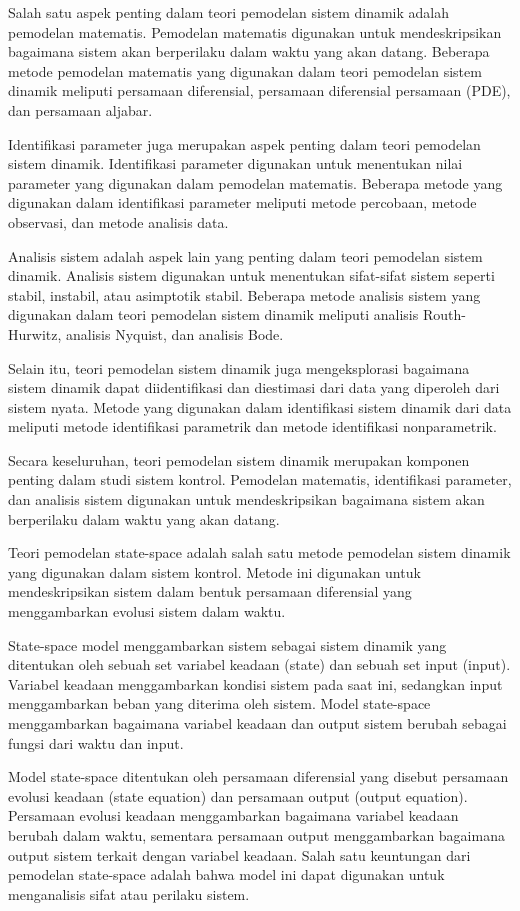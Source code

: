 Salah satu aspek penting dalam teori pemodelan sistem dinamik adalah pemodelan matematis. Pemodelan matematis digunakan untuk mendeskripsikan bagaimana sistem akan berperilaku dalam waktu yang akan datang. Beberapa metode pemodelan matematis yang digunakan dalam teori pemodelan sistem dinamik meliputi persamaan diferensial, persamaan diferensial persamaan (PDE), dan persamaan aljabar.

Identifikasi parameter juga merupakan aspek penting dalam teori pemodelan sistem dinamik. Identifikasi parameter digunakan untuk menentukan nilai parameter yang digunakan dalam pemodelan matematis. Beberapa metode yang digunakan dalam identifikasi parameter meliputi metode percobaan, metode observasi, dan metode analisis data.

Analisis sistem adalah aspek lain yang penting dalam teori pemodelan sistem dinamik. Analisis sistem digunakan untuk menentukan sifat-sifat sistem seperti stabil, instabil, atau asimptotik stabil. Beberapa metode analisis sistem yang digunakan dalam teori pemodelan sistem dinamik meliputi analisis Routh-Hurwitz, analisis Nyquist, dan analisis Bode.

Selain itu, teori pemodelan sistem dinamik juga mengeksplorasi bagaimana sistem dinamik dapat diidentifikasi dan diestimasi dari data yang diperoleh dari sistem nyata. Metode yang digunakan dalam identifikasi sistem dinamik dari data meliputi metode identifikasi parametrik dan metode identifikasi nonparametrik.

Secara keseluruhan, teori pemodelan sistem dinamik merupakan komponen penting dalam studi sistem kontrol. Pemodelan matematis, identifikasi parameter, dan analisis sistem digunakan untuk mendeskripsikan bagaimana sistem akan berperilaku dalam waktu yang akan datang. 

Teori pemodelan state-space adalah salah satu metode pemodelan sistem dinamik yang digunakan dalam sistem kontrol. Metode ini digunakan untuk mendeskripsikan sistem dalam bentuk persamaan diferensial yang menggambarkan evolusi sistem dalam waktu.

State-space model menggambarkan sistem sebagai sistem dinamik yang ditentukan oleh sebuah set variabel keadaan (state) dan sebuah set input (input). Variabel keadaan menggambarkan kondisi sistem pada saat ini, sedangkan input menggambarkan beban yang diterima oleh sistem. Model state-space menggambarkan bagaimana variabel keadaan dan output sistem berubah sebagai fungsi dari waktu dan input.

Model state-space ditentukan oleh persamaan diferensial yang disebut persamaan evolusi keadaan (state equation) dan persamaan output (output equation). Persamaan evolusi keadaan menggambarkan bagaimana variabel keadaan berubah dalam waktu, sementara persamaan output menggambarkan bagaimana output sistem terkait dengan variabel keadaan. Salah satu keuntungan dari pemodelan state-space adalah bahwa model ini dapat digunakan untuk menganalisis sifat atau perilaku sistem.


